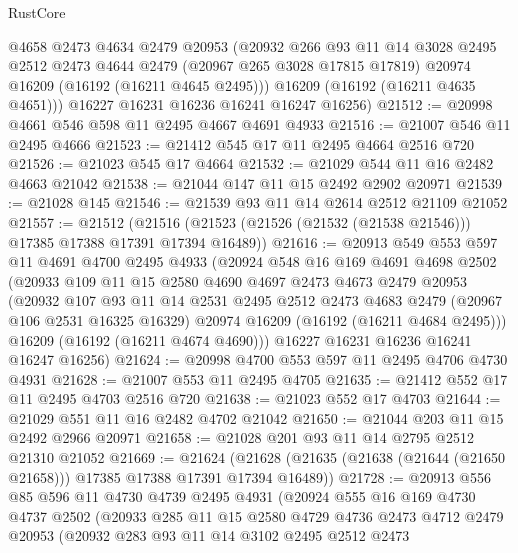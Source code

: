 \begin{lexlean}{RustCore}
\begin{coremodule}
        @4658
        @2473
        @4634
        @2479
        @20953
        (@20932
          @266
          @93
          @11
          @14
          @3028
          @2495
          @2512
          @2473
          @4644
          @2479
          (@20967 @265 @3028 @17815 @17819)
          @20974
          @16209
          (@16192 (@16211 @4645 @2495)))
        @16209
        (@16192 (@16211 @4635 @4651)))
      @16227
      @16231
      @16236
      @16241
      @16247
      @16256)
@21512 := @20998 @4661 @546 @598 @11 @2495 @4667 @4691 @4933
@21516 := @21007 @546 @11 @2495 @4666
@21523 := @21412 @545 @17 @11 @2495 @4664 @2516 @720
@21526 := @21023 @545 @17 @4664
@21532 := @21029 @544 @11 @16 @2482 @4663 @21042
@21538 := @21044 @147 @11 @15 @2492 @2902 @20971
@21539 := @21028 @145
@21546 := @21539 @93 @11 @14 @2614 @2512 @21109 @21052
@21557 := @21512
    (@21516 (@21523 (@21526 (@21532 (@21538 @21546))) @17385 @17388 @17391 @17394 @16489))
@21616 := @20913
    @549
    @553
    @597
    @11
    @4691
    @4700
    @2495
    @4933
    (@20924
      @548
      @16
      @169
      @4691
      @4698
      @2502
      (@20933
        @109
        @11
        @15
        @2580
        @4690
        @4697
        @2473
        @4673
        @2479
        @20953
        (@20932
          @107
          @93
          @11
          @14
          @2531
          @2495
          @2512
          @2473
          @4683
          @2479
          (@20967 @106 @2531 @16325 @16329)
          @20974
          @16209
          (@16192 (@16211 @4684 @2495)))
        @16209
        (@16192 (@16211 @4674 @4690)))
      @16227
      @16231
      @16236
      @16241
      @16247
      @16256)
@21624 := @20998 @4700 @553 @597 @11 @2495 @4706 @4730 @4931
@21628 := @21007 @553 @11 @2495 @4705
@21635 := @21412 @552 @17 @11 @2495 @4703 @2516 @720
@21638 := @21023 @552 @17 @4703
@21644 := @21029 @551 @11 @16 @2482 @4702 @21042
@21650 := @21044 @203 @11 @15 @2492 @2966 @20971
@21658 := @21028 @201 @93 @11 @14 @2795 @2512 @21310 @21052
@21669 := @21624
    (@21628 (@21635 (@21638 (@21644 (@21650 @21658))) @17385 @17388 @17391 @17394 @16489))
@21728 := @20913
    @556
    @85
    @596
    @11
    @4730
    @4739
    @2495
    @4931
    (@20924
      @555
      @16
      @169
      @4730
      @4737
      @2502
      (@20933
        @285
        @11
        @15
        @2580
        @4729
        @4736
        @2473
        @4712
        @2479
        @20953
        (@20932
          @283
          @93
          @11
          @14
          @3102
          @2495
          @2512
          @2473

\end{coremodule}
\end{lexlean}

